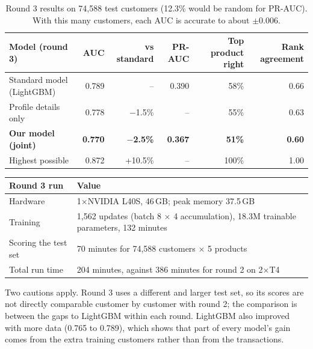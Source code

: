 \documentclass[10pt,a4paper]{article}
\begin{document}
\begin{table}[!htb]
\centering\footnotesize
\begin{tabular}{@{}lrrrrr@{}}
\toprule
\textbf{Model (round 3)} & \textbf{AUC} & \textbf{vs standard} & \textbf{PR-AUC} & \textbf{Top product right} & \textbf{Rank agreement} \\
\midrule
Standard model (LightGBM) & 0.789 & -- & 0.390 & 58\% & 0.66 \\
Profile details only & 0.778 & $-$1.5\% & -- & 55\% & 0.63 \\
\textbf{Our model (joint)} & \textbf{0.770} & \textbf{$-$2.5\%} & \textbf{0.367} & \textbf{51\%} & \textbf{0.60} \\
Highest possible & 0.872 & +10.5\% & -- & 100\% & 1.00 \\
\bottomrule
\end{tabular}
\caption{Round 3 results on 74,588 test customers (12.3\% would be random for PR-AUC). With this many customers, each AUC is accurate to about $\pm$0.006.}
\end{table}

\begin{tabularx}{\linewidth}{@{}L{4.6cm}X@{}}
\toprule
\textbf{Round 3 run} & \textbf{Value} \\
\midrule
Hardware & 1$\times$NVIDIA L40S, 46\,GB; peak memory 37.5\,GB \\
Training & 1,562 updates (batch 8 $\times$ 4 accumulation), 18.3M trainable parameters, 132 minutes \\
Scoring the test set & 70 minutes for 74,588 customers $\times$ 5 products \\
Total run time & 204 minutes, against 386 minutes for round 2 on 2$\times$T4 \\
\bottomrule
\end{tabularx}

Two cautions apply. Round 3 uses a different and larger test set, so its scores are not directly comparable customer by customer with round 2; the comparison is between the gaps to LightGBM within each round. LightGBM also improved with more data (0.765 to 0.789), which shows that part of every model's gain comes from the extra training customers rather than from the transactions.
\end{document}
